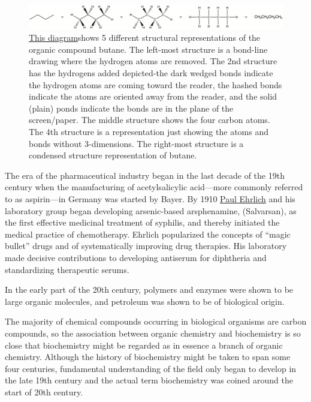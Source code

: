 \begin{figure}

{\centering \includegraphics[width=0.7\linewidth]{./figures/chemistry/Stuctural_drawings_of_butane_854px} 

}

\caption{\href{https://commons.wikimedia.org/wiki/File:Stuctural_drawings_of_butane_854px.jpg}{This diagram}shows 5 different structural representations of the organic compound butane. The left-most structure is a bond-line drawing where the hydrogen atoms are removed. The 2nd structure has the hydrogens added depicted-the dark wedged bonds indicate the hydrogen atoms are coming toward the reader, the hashed bonds indicate the atoms are oriented away from the reader, and the solid (plain) ponds indicate the bonds are in the plane of the screen/paper. The middle structure shows the four carbon atoms. The 4th structure is a representation just showing the atoms and bonds without 3-dimensions. The right-most structure is a condensed structure representation of butane.}\label{fig:chemstrucrep}
\end{figure}

The era of the pharmaceutical industry began in the last decade of the 19th century when the manufacturing of acetylsalicylic acid---more commonly referred to as aspirin---in Germany was started by Bayer. By 1910 \href{https://en.wikipedia.org/wiki/Paul_Ehrlich}{Paul Ehrlich} and his laboratory group began developing arsenic-based arsphenamine, (Salvarsan), as the first effective medicinal treatment of syphilis, and thereby initiated the medical practice of chemotherapy. Ehrlich popularized the concepts of ``magic bullet'' drugs and of systematically improving drug therapies. His laboratory made decisive contributions to developing antiserum for diphtheria and standardizing therapeutic serums.

In the early part of the 20th century, polymers and enzymes were shown to be large organic molecules, and petroleum was shown to be of biological origin.

The majority of chemical compounds occurring in biological organisms are carbon compounds, so the association between organic chemistry and biochemistry is so close that biochemistry might be regarded as in essence a branch of organic chemistry. Although the history of biochemistry might be taken to span some four centuries, fundamental understanding of the field only began to develop in the late 19th century and the actual term biochemistry was coined around the start of 20th century.

